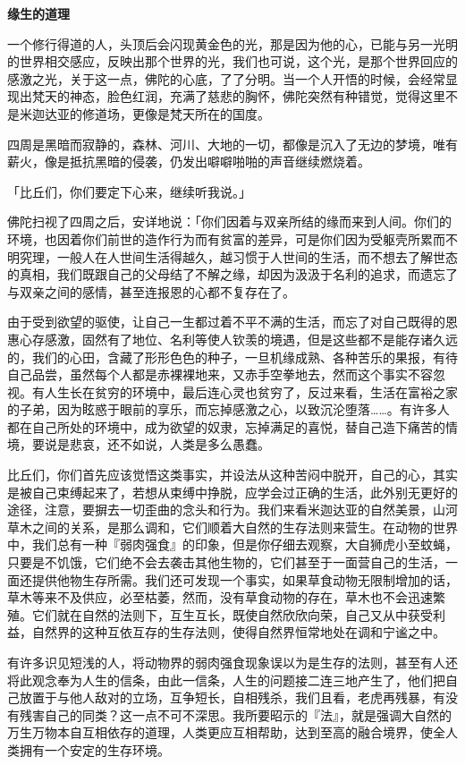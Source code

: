 \documentclass[twoside,openany]{book}
\newcommand{\mt}[1]{\textbullet \textbf{#1}}
\begin{document}
\mt{缘生的道理}

一个修行得道的人，头顶后会闪现黄金色的光，那是因为他的心，已能与另一光明的世界相交感应，反映出那个世界的光，我们也可说，这个光，是那个世界回应的感激之光，关于这一点，佛陀的心底，了了分明。当一个人开悟的时候，会经常显现出梵天的神态，脸色红润，充满了慈悲的胸怀，佛陀突然有种错觉，觉得这里不是米迦达亚的修道场，更像是梵天所在的国度。

四周是黑暗而寂静的，森林、河川、大地的一切，都像是沉入了无边的梦境，唯有薪火，像是抵抗黑暗的侵袭，仍发出噼噼啪啪的声音继续燃烧着。

「比丘们，你们要定下心来，继续听我说。」

佛陀扫视了四周之后，安详地说：「你们因着与双亲所结的缘而来到人间。你们的环境，也因着你们前世的造作行为而有贫富的差异，可是你们因为受躯壳所累而不明究理，一般人在人世间生活得越久，越习惯于人世间的生活，而不想去了解世态的真相，我们既跟自己的父母结了不解之缘，却因为汲汲于名利的追求，而遗忘了与双亲之间的感情，甚至连报恩的心都不复存在了。

由于受到欲望的驱使，让自己一生都过着不平不满的生活，而忘了对自己既得的恩惠心存感激，固然有了地位、名利等使人钦羡的境遇，但是这些都不是能存诸久远的，我们的心田，含藏了形形色色的种子，一旦机缘成熟、各种苦乐的果报，有待自己品尝，虽然每个人都是赤裸裸地来，又赤手空拳地去，然而这个事实不容忽视。有人生长在贫穷的环境中，最后连心灵也贫穷了，反过来看，生活在富裕之家的子弟，因为眩惑于眼前的享乐，而忘掉感激之心，以致沉沦堕落……。有许多人都在自己所处的环境中，成为欲望的奴隶，忘掉满足的喜悦，替自己造下痛苦的情境，要说是悲哀，还不如说，人类是多么愚蠢。

比丘们，你们首先应该觉悟这类事实，并设法从这种苦闷中脱开，自己的心，其实是被自己束缚起来了，若想从束缚中挣脱，应学会过正确的生活，此外别无更好的途径，注意，要摒去一切歪曲的念头和行为。我们来看米迦达亚的自然美景，山河草木之间的关系，是那么调和，它们顺着大自然的生存法则来营生。在动物的世界中，我们总有一种『弱肉强食』的印象，但是你仔细去观察，大自狮虎小至蚊蝇，只要是不饥饿，它们绝不会去袭击其他生物的，它们甚至于一面营自己的生活，一面还提供他物生存所需。我们还可发现一个事实，如果草食动物无限制增加的话，草木等来不及供应，必至枯萎，然而，没有草食动物的存在，草木也不会迅速繁殖。它们就在自然的法则下，互生互长，既使自然欣欣向荣，自己又从中获受利益，自然界的这种互依互存的生存法则，使得自然界恒常地处在调和宁谧之中。

有许多识见短浅的人，将动物界的弱肉强食现象误以为是生存的法则，甚至有人还将此观念奉为人生的信条，由此一信条，人生的问题接二连三地产生了，他们把自己放置于与他人敌对的立场，互争短长，自相残杀，我们且看，老虎再残暴，有没有残害自己的同类？这一点不可不深思。我所要昭示的『法』，就是强调大自然的万生万物本自互相依存的道理，人类更应互相帮助，达到至高的融合境界，使全人类拥有一个安定的生存环境。
\end{document}
